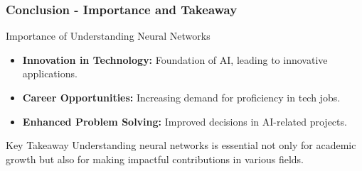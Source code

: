 \documentclass[aspectratio=169]{beamer}
\begin{document}
\begin{frame}[fragile]
    \frametitle{Conclusion - Importance and Takeaway}
    \begin{block}{Importance of Understanding Neural Networks}
        \begin{itemize}
            \item \textbf{Innovation in Technology:} Foundation of AI, leading to innovative applications.
            \item \textbf{Career Opportunities:} Increasing demand for proficiency in tech jobs.
            \item \textbf{Enhanced Problem Solving:} Improved decisions in AI-related projects.
        \end{itemize}
    \end{block}

    \begin{block}{Key Takeaway}
        Understanding neural networks is essential not only for academic growth but also for making impactful contributions in various fields.
    \end{block}
\end{frame}
\end{document}
